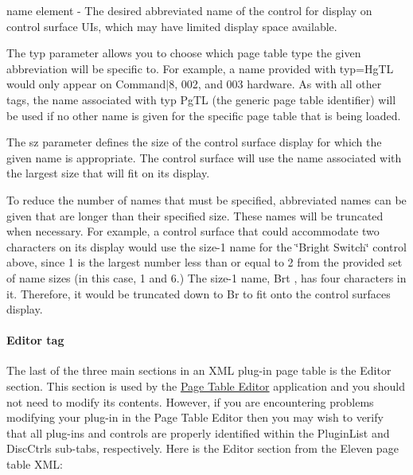 {\ttfamily name} element -\/ The desired abbreviated name of the control for display on control surface U\+Is, which may have limited display space available.

The {\ttfamily typ} parameter allows you to choose which page table type the given abbreviation will be specific to. For example, a name provided with {\ttfamily typ=\textquotesingle{}Hg\+T\+L\textquotesingle{}} would only appear on Command$\vert$8, 002, and 003 hardware. As with all other tags, the name associated with typ {\ttfamily Pg\+T\+L} (the generic page table identifier) will be used if no other name is given for the specific page table that is being loaded.

The {\ttfamily sz} parameter defines the size of the control surface display for which the given name is appropriate. The control surface will use the name associated with the largest size that will fit on its display.

To reduce the number of names that must be specified, abbreviated names can be given that are longer than their specified size. These names will be truncated when necessary. For example, a control surface that could accommodate two characters on its display would use the size-\/1 name for the \char`\"{}\+Bright Switch\char`\"{} control above, since 1 is the largest number less than or equal to 2 from the provided set of name sizes (in this case, 1 and 6.) The size-\/1 name, {\ttfamily \textquotesingle{}Brt \textquotesingle{}}, has four characters in it. Therefore, it would be truncated down to {\ttfamily \textquotesingle{}Br\textquotesingle{}} to fit onto the control surface\textquotesingle{}s display.

\hypertarget{a00363_subsubsection_editor_tag}{}\paragraph{Editor tag}\label{a00363_subsubsection_editor_tag}
The last of the three main sections in an X\+M\+L plug-\/in page table is the {\ttfamily Editor} section. This section is used by the \hyperlink{a00363_subsection_creating_page_tables_in_pete}{Page Table Editor} application and you should not need to modify its contents. However, if you are encountering problems modifying your plug-\/in in the Page Table Editor then you may wish to verify that all plug-\/ins and controls are properly identified within the {\ttfamily Plugin\+List} and {\ttfamily Disc\+Ctrls} sub-\/tabs, respectively. Here is the {\ttfamily Editor} section from the Eleven page table X\+M\+L\+:



